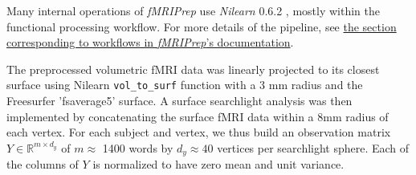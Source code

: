 \begin{description}
\end{description}

Many internal operations of \emph{fMRIPrep} use \emph{Nilearn} 0.6.2
\citep[RRID:SCR\_001362]{Nilearn}, mostly within the functional
processing workflow. For more details of the pipeline, see
\href{https://fmriprep.readthedocs.io/en/latest/workflows.html}{the
section corresponding to workflows in \emph{fMRIPrep}'s documentation}.


The preprocessed volumetric fMRI data was linearly projected to its closest surface
using Nilearn \texttt{vol\_to\_surf} function with a 3 mm radius and the
Freesurfer 'fsaverage5' surface. A surface searchlight
analysis was then implemented by concatenating the surface
fMRI data within a 8mm radius of each vertex. For each subject and vertex, we
thus build an observation matrix $Y \in \mathbb{R}^{m \times d_y}$ of $m\approx$ 1400 words
by $d_y\approx40$ vertices per searchlight sphere. Each of the columns of $Y$ is normalized to have zero mean and unit variance.

